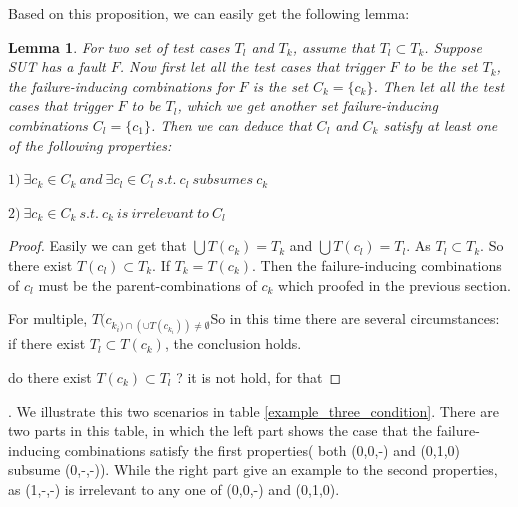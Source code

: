 \documentclass{sig-alternate}
\begin{document}

Based on this proposition, we can easily get the following lemma:

\newtheorem{lemma}{Lemma}
\begin{lemma}
For two set of test cases $T_{l}$ and $T_{k}$, assume that $T_{l} \subset T_{k}$. Suppose SUT has a  fault $F$. Now first let all the test cases that trigger $F$ to be the set $T_{k}$, the failure-inducing combinations for $F$ is the set $C_{k}= \{ c_{k}\}$. Then let all the test cases that trigger $F$ to be $T_{l}$, which we get another set failure-inducing combinations $C_{l} = \{ c_{1} \}$. Then we can deduce that $C_{l}$ and $C_{k}$ satisfy at least one of the following properties:

$ 1)\ \exists c_{k} \in C_{k}\ and\ \exists c_{l} \in C_{l} \ s.t.\ c_{l}\ subsumes\ c_{k}  $

$2)\ \exists c_{k} \in C_{k}\ s.t.\ c_{k}\ is\ irrelevant\ to\ C_{l} $

\end{lemma}

\begin{proof}
 Easily we can get that $\bigcup T(c_{k}) = T_{k}$ and $\bigcup T(c_{l}) = T_{l}$.  As $T_{l} \subset T_{k}$. So there exist $T(c_{l}) \subset T_{k}$. If $T_{k} = T(c_{k})$. Then the failure-inducing combinations of $c_{l}$ must be the parent-combinations of $c_{k}$ which proofed in the previous section.

For multiple,  $T(c_{k_{i}) \cap  (\cup T(c_{k_{i}})) \neq \emptyset } $So in this time there are several circumstances:
if there exist $T_{l} \subset T(c_{k})$, the conclusion holds.

 do there exist $T(c_{k}) \subset T_{l}$ ? it is not hold, for that


\end{proof}.
We illustrate this two scenarios in table \ref{example_three_condition}. There are two parts in this table, in which the left part shows the case that the failure-inducing combinations satisfy the first properties( both (0,0,-) and (0,1,0) subsume (0,-,-)). While the right part give an example to the second properties, as (1,-,-) is irrelevant to any one of (0,0,-) and (0,1,0).
\end{document}
